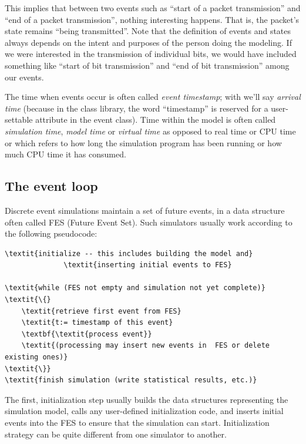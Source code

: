 This implies that between two events such as ``start of a packet
transmission'' and ``end of a packet transmission'', nothing
interesting happens. That is, the packet's state remains ``being
transmitted''. Note that the definition of events and states always
depends on the intent and purposes of the person doing the modeling.
If we were interested in the transmission of individual bits, we would
have included something like ``start of bit transmission'' and ``end
of bit transmission'' among our events.


The time when events occur is often called \textit{event
  timestamp}; with {\opp} we'll say
\textit{arrival time} (because in the class
library, the word ``timestamp'' is reserved for a user-settable
attribute in the event class). Time within the model is often called
\textit{simulation time}, \textit{model
  time} or \textit{virtual time}
as opposed to real time or CPU time
or which refers to how long the simulation program has been running or
how much CPU time it has consumed.





\subsection{The event loop}

Discrete event simulations maintain a set of future
events, in a data structure often called
FES (Future Event Set). Such simulators usually work
according to the following pseudocode:

\begin{Verbatim}[commandchars=\\\{\}]
\textit{initialize -- this includes building the model and}
              \textit{inserting initial events to FES}

\textit{while (FES not empty and simulation not yet complete)}
\textit{\{}
    \textit{retrieve first event from FES}
    \textit{t:= timestamp of this event}
    \textbf{\textit{process event}}
    \textit{(processing may insert new events in  FES or delete existing ones)}
\textit{\}}
\textit{finish simulation (write statistical results, etc.)}
\end{Verbatim}


The first, initialization step usually builds the data structures
representing the simulation model, calls any user-defined
initialization code, and inserts initial events
into the FES to ensure that the simulation can start. Initialization
strategy can be quite different from one simulator to another.



